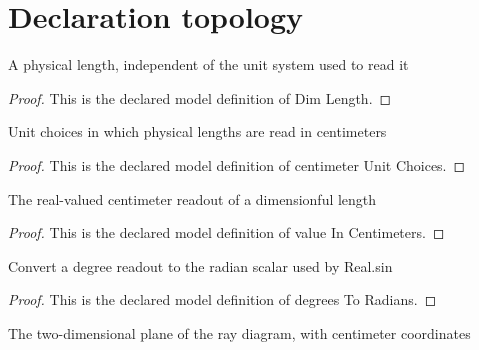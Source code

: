 \section{Declaration topology}
\begin{definition}
  \label{def:physics:phyx-mini-0102:phyxminiproblems-problemphyxmini0102-dimlength}
  A physical length, independent of the unit system used to read it
\end{definition}
\begin{proof}
  This is the declared model definition of Dim Length.
\end{proof}
\begin{definition}
  \label{def:physics:phyx-mini-0102:phyxminiproblems-problemphyxmini0102-centimeterunitchoices}
  Unit choices in which physical lengths are read in centimeters
\end{definition}
\begin{proof}
  This is the declared model definition of centimeter Unit Choices.
\end{proof}
\begin{definition}
  \label{def:physics:phyx-mini-0102:phyxminiproblems-problemphyxmini0102-valueincentimeters}
  The real-valued centimeter readout of a dimensionful length
\end{definition}
\begin{proof}
  This is the declared model definition of value In Centimeters.
\end{proof}
\begin{definition}
  \label{def:physics:phyx-mini-0102:phyxminiproblems-problemphyxmini0102-degreestoradians}
  Convert a degree readout to the radian scalar used by Real.sin
\end{definition}
\begin{proof}
  This is the declared model definition of degrees To Radians.
\end{proof}
\begin{definition}
  \label{def:physics:phyx-mini-0102:phyxminiproblems-problemphyxmini0102-diagramplane}
  The two-dimensional plane of the ray diagram, with centimeter coordinates
\end{definition}
